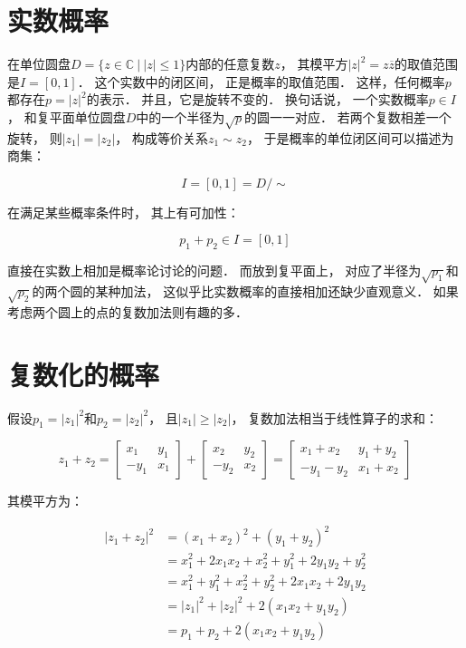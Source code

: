 \documentclass[10pt, openany]{book}
\begin{document}
\section{实数概率}

在单位圆盘$D = \{z \in \mathbb C \ | \ |z| \leq 1\}$内部的任意复数$z$，
其模平方$|z|^2 = z \overline z$的取值范围是$I = [0,1]$．
这个实数中的闭区间，
正是概率的取值范围．
这样，任何概率$p$都存在$p = |z|^2$的表示．
并且，它是旋转不变的．
换句话说，
一个实数概率$p\in I$，
和复平面单位圆盘$D$中的一个半径为$\sqrt{p}$的圆一一对应．
若两个复数相差一个旋转，
则$|z_1| = |z_2|$，
构成等价关系$z_1 \sim z_2$，
于是概率的单位闭区间可以描述为商集：

$$
I = [0,1] = D/\sim
$$

在满足某些概率条件时，
其上有可加性：

\begin{equation}
p_1 + p_2 \in I = [0,1]
\end{equation}
\label{eq:real-prob-sum}

直接在实数上相加是概率论讨论的问题．
而放到复平面上，
对应了半径为$\sqrt{p_1}$和$\sqrt{p_2}$的两个圆的某种加法，
这似乎比实数概率的直接相加还缺少直观意义．
如果考虑两个圆上的点的复数加法则有趣的多．

\section{复数化的概率}

假设$p_1 = |z_1|^2$和$p_2 = |z_2|^2$，
且$|z_1| \geq |z_2|$，
复数加法相当于线性算子的求和：

$$
z_1 + z_2
=\begin{bmatrix}x_1 & y_1 \\ -y_1 & x_1\end{bmatrix}
+ \begin{bmatrix}x_2 & y_2 \\ -y_2 & x_2\end{bmatrix}
= \begin{bmatrix}x_1 + x_2 & y_1 + y_2 \\ -y_1 - y_2 & x_1 + x_2 \end{bmatrix}
$$

其模平方为：

\begin{equation}
\begin{aligned}
|z_1 + z_2|^2
&= (x_1 + x_2)^2 + (y_1 + y_2)^2 \\
&= x_1^2 + 2x_1x_2 + x_2^2 + y_1^2 + 2y_1y_2 + y_2^2 \\
&= x_1^2 + y_1^2 + x_2^2 + y_2^2 + 2x_1x_2 + 2y_1y_2 \\
&= |z_1|^2 + |z_2|^2 + 2(x_1x_2 + y_1y_2) \\
&= p_1 + p_2 + 2(x_1x_2 + y_1y_2) \\
\end{aligned}
\end{equation}
\label{eq:complex-prob-sum}
\end{document}
